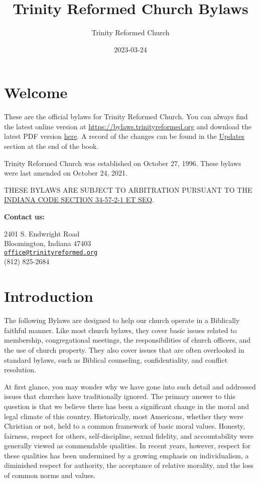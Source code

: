 \documentclass[
]{book}
\title{Trinity Reformed Church Bylaws}
\author{Trinity Reformed Church}
\date{2023-03-24}
\begin{document}
\maketitle

{
\hypersetup{linkcolor=}
\setcounter{tocdepth}{1}
\tableofcontents
}
\hypertarget{welcome}{%
\chapter*{Welcome}\label{welcome}}

These are the official bylaws for Trinity Reformed Church. You can always find the latest online version at \url{https://bylaws.trinityreformed.org} and download the latest PDF version \href{https://bylaws.trinityreformed.org/trc-bylaws.pdf}{here}. A record of the changes can be found in the \href{https://bylaws.trinityreformed.org/updates.html}{Updates} section at the end of the book.

Trinity Reformed Church was established on October 27, 1996. These bylaws were last amended on October 24, 2021.

THESE BYLAWS ARE SUBJECT TO ARBITRATION PURSUANT TO THE \href{https://iga.in.gov/legislative/laws/2022/ic/titles/034\#34-57-2-1}{INDIANA CODE SECTION 34-57-2-1 ET SEQ}.

\textbf{Contact us:}

2401 S. Endwright Road\\
Bloomington, Indiana 47403\\
\href{mailto:office@trinityreformed.org}{\nolinkurl{office@trinityreformed.org}}\\
(812) 825-2684

\mainmatter

\hypertarget{introduction}{%
\chapter{Introduction}\label{introduction}}

The following Bylaws are designed to help our church operate in a Biblically faithful manner. Like most church bylaws, they cover basic issues related to membership, congregational meetings, the responsibilities of church officers, and the use of church property. They also cover issues that are often overlooked in standard bylaws, such as Biblical counseling, confidentiality, and conflict resolution.

At first glance, you may wonder why we have gone into such detail and addressed issues that churches have traditionally ignored. The primary answer to this question is that we believe there has been a significant change in the moral and legal climate of this country. Historically, most Americans, whether they were Christian or not, held to a common framework of basic moral values. Honesty, fairness, respect for others, self-discipline, sexual fidelity, and accountability were generally viewed as commendable qualities. In recent years, however, respect for these qualities has been undermined by a growing emphasis on individualism, a diminished respect for authority, the acceptance of relative morality, and the loss of common norms and values.
\end{document}
